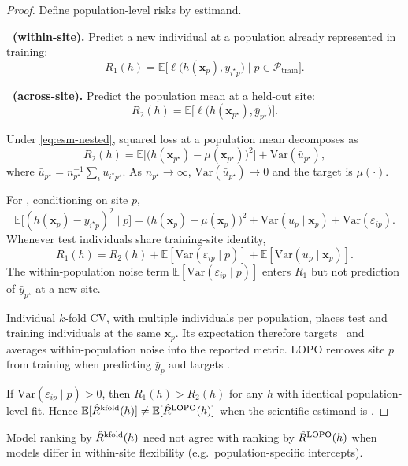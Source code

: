 \documentclass[11pt]{article}
\begin{document}
\begin{proof}
Define population-level risks by estimand.

\textbf{\Eone\ (within-site).}  Predict a new individual at a population
already represented in training:
\[
  R_1(h) = \mathbb{E}\Big[\ell\big(h(\mathbf{x}_p), y_{i^\star p}\big)
  \;\Big|\; p \in \mathcal{P}_{\mathrm{train}}\Big].
\]

\textbf{\Etwo\ (across-site).}  Predict the population mean at a held-out site:
\[
  R_2(h) = \mathbb{E}\Big[\ell\big(h(\mathbf{x}_{p^\star}),
  \bar{y}_{p^\star}\big)\Big].
\]

Under \eqref{eq:esm-nested}, squared loss at a population mean decomposes as
\[
  R_2(h) = \mathbb{E}\Big[\big(h(\mathbf{x}_{p^\star})
  - \mu(\mathbf{x}_{p^\star})\big)^2\Big]
  + \mathrm{Var}(\bar{u}_{p^\star}),
\]
where $\bar{u}_{p^\star}=n_{p^\star}^{-1}\sum_i u_{i^\star p^\star}$.
As $n_{p^\star}\to\infty$, $\mathrm{Var}(\bar{u}_{p^\star})\to 0$ and the
target is $\mu(\cdot)$.

For \Eone, conditioning on site $p$,
\[
  \mathbb{E}\big[(h(\mathbf{x}_p)-y_{i^\star p})^2 \mid p\big]
  = \big(h(\mathbf{x}_p)-\mu(\mathbf{x}_p)\big)^2
  + \mathrm{Var}(u_p\mid\mathbf{x}_p)
  + \mathrm{Var}(\varepsilon_{ip}).
\]
Whenever test individuals share training-site identity,
\[
  R_1(h) = R_2(h) + \mathbb{E}[\mathrm{Var}(\varepsilon_{ip}\mid p)]
  + \mathbb{E}[\mathrm{Var}(u_p\mid\mathbf{x}_p)].
\]
The within-population noise term
$\mathbb{E}[\mathrm{Var}(\varepsilon_{ip}\mid p)]$ enters $R_1$ but not
prediction of $\bar{y}_{p^\star}$ at a new site.

Individual $k$-fold CV, with multiple individuals per population, places
test and training individuals at the same $\mathbf{x}_p$.  Its expectation
therefore targets \Eone\ and averages within-population noise into the
reported metric.  LOPO removes site $p$ from training when predicting
$\bar{y}_p$ and targets \Etwo.

If $\mathrm{Var}(\varepsilon_{ip}\mid p)>0$, then $R_1(h)>R_2(h)$ for any
$h$ with identical population-level fit.  Hence
$\mathbb{E}[\hat{R}^{\mathrm{kfold}}(h)] \neq \mathbb{E}[\hat{R}^{\mathrm{LOPO}}(h)]$ when the scientific
estimand is \Etwo.
\end{proof}

\begin{corollary}
\label{cor:esm-ranking-bias}
Model ranking by $\hat{R}^{\mathrm{kfold}}(h)$ need not agree with ranking by $\hat{R}^{\mathrm{LOPO}}(h)$
when models differ in within-site flexibility (e.g.\ population-specific
intercepts).
\end{corollary}
\end{document}

